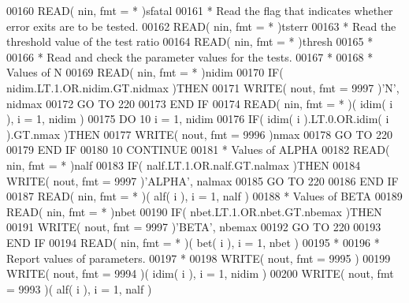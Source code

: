 \begin{DoxyCode}
00160       \textcolor{keyword}{READ}( nin, fmt = * )sfatal
00161 \textcolor{comment}{*     Read the flag that indicates whether error exits are to be tested.}
00162       \textcolor{keyword}{READ}( nin, fmt = * )tsterr
00163 \textcolor{comment}{*     Read the threshold value of the test ratio}
00164       \textcolor{keyword}{READ}( nin, fmt = * )thresh
00165 \textcolor{comment}{*}
00166 \textcolor{comment}{*     Read and check the parameter values for the tests.}
00167 \textcolor{comment}{*}
00168 \textcolor{comment}{*     Values of N}
00169       \textcolor{keyword}{READ}( nin, fmt = * )nidim
00170       \textcolor{keywordflow}{IF}( nidim.LT.1.OR.nidim.GT.nidmax )\textcolor{keywordflow}{THEN}
00171          \textcolor{keyword}{WRITE}( nout, fmt = 9997 )\textcolor{stringliteral}{'N'}, nidmax
00172          \textcolor{keywordflow}{GO TO} 220
00173 \textcolor{keywordflow}{      END IF}
00174       \textcolor{keyword}{READ}( nin, fmt = * )( idim( i ), i = 1, nidim )
00175       \textcolor{keywordflow}{DO} 10 i = 1, nidim
00176          \textcolor{keywordflow}{IF}( idim( i ).LT.0.OR.idim( i ).GT.nmax )\textcolor{keywordflow}{THEN}
00177             \textcolor{keyword}{WRITE}( nout, fmt = 9996 )nmax
00178             \textcolor{keywordflow}{GO TO} 220
00179 \textcolor{keywordflow}{         END IF}
00180    10 \textcolor{keywordflow}{CONTINUE}
00181 \textcolor{comment}{*     Values of ALPHA}
00182       \textcolor{keyword}{READ}( nin, fmt = * )nalf
00183       \textcolor{keywordflow}{IF}( nalf.LT.1.OR.nalf.GT.nalmax )\textcolor{keywordflow}{THEN}
00184          \textcolor{keyword}{WRITE}( nout, fmt = 9997 )\textcolor{stringliteral}{'ALPHA'}, nalmax
00185          \textcolor{keywordflow}{GO TO} 220
00186 \textcolor{keywordflow}{      END IF}
00187       \textcolor{keyword}{READ}( nin, fmt = * )( alf( i ), i = 1, nalf )
00188 \textcolor{comment}{*     Values of BETA}
00189       \textcolor{keyword}{READ}( nin, fmt = * )nbet
00190       \textcolor{keywordflow}{IF}( nbet.LT.1.OR.nbet.GT.nbemax )\textcolor{keywordflow}{THEN}
00191          \textcolor{keyword}{WRITE}( nout, fmt = 9997 )\textcolor{stringliteral}{'BETA'}, nbemax
00192          \textcolor{keywordflow}{GO TO} 220
00193 \textcolor{keywordflow}{      END IF}
00194       \textcolor{keyword}{READ}( nin, fmt = * )( bet( i ), i = 1, nbet )
00195 \textcolor{comment}{*}
00196 \textcolor{comment}{*     Report values of parameters.}
00197 \textcolor{comment}{*}
00198       \textcolor{keyword}{WRITE}( nout, fmt = 9995 )
00199       \textcolor{keyword}{WRITE}( nout, fmt = 9994 )( idim( i ), i = 1, nidim )
00200       \textcolor{keyword}{WRITE}( nout, fmt = 9993 )( alf( i ), i = 1, nalf )

\end{DoxyCode}
